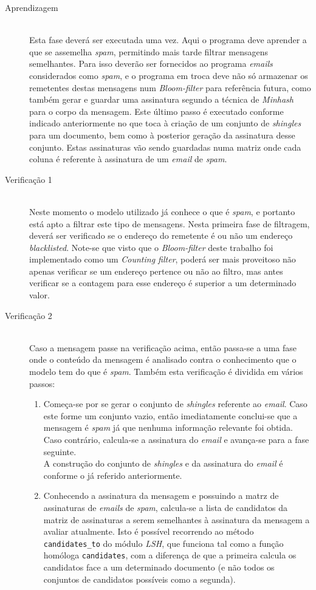 \documentclass[a4paper,11pt,openright,oneside]{report}
\begin{document}
\begin{description}
\item[Aprendizagem] \hfill \\
  Esta fase deverá ser executada uma vez. Aqui o programa deve aprender a que se assemelha \textit{spam}, permitindo mais tarde filtrar mensagens semelhantes. Para isso deverão ser fornecidos ao programa \textit{emails} considerados como \textit{spam}, e o programa em troca deve não só armazenar os remetentes destas mensagens num \textit{Bloom-filter} para referência futura, como também gerar e guardar uma assinatura segundo a técnica de \textit{Minhash} para o corpo da mensagem. Este último passo é executado conforme indicado anteriormente no que toca à criação de um conjunto de \textit{shingles} para um documento, bem como à posterior geração da assinatura desse conjunto. Estas assinaturas vão sendo guardadas numa matriz onde cada coluna é referente à assinatura de um \textit{email} de \textit{spam}.
\item[Verificação 1] \hfill \\
  Neste momento o modelo utilizado já conhece o que é \textit{spam}, e portanto está apto a filtrar este tipo de mensagens. Nesta primeira fase de filtragem, deverá ser verificado se o endereço do remetente é ou não um endereço \textit{blacklisted}. Note-se que visto que o \textit{Bloom-filter} deste trabalho foi implementado como um \textit{Counting filter}, poderá ser mais proveitoso não apenas verificar se um endereço pertence ou não ao filtro, mas antes verificar se a contagem para esse endereço é superior a um determinado valor.
\item[Verificação 2] \hfill \\
  Caso a mensagem passe na verificação acima, então passa-se a uma fase onde o conteúdo da mensagem é analisado contra o conhecimento que o modelo tem do que é \textit{spam}. Também esta verificação é dividida em vários passos:
  \begin{enumerate}
  \item Começa-se por se gerar o conjunto de \textit{shingles} referente ao \textit{email}. Caso este forme um conjunto vazio, então imediatamente conclui-se que a mensagem é \textit{spam} já que nenhuma informação relevante foi obtida. Caso contrário, calcula-se a assinatura do \textit{email} e avança-se para a fase seguinte. \\
    A construção do conjunto de \textit{shingles} e da assinatura do \textit{email} é conforme o já referido anteriormente.
  \item Conhecendo a assinatura da mensagem e possuindo a matrz de assinaturas de \textit{emails} de \textit{spam}, calcula-se a lista de candidatos da matriz de assinaturas a serem semelhantes à assinatura da mensagem a avaliar atualmente. Isto é possível recorrendo ao método \texttt{candidates\_to} do módulo \textit{LSH}, que funciona tal como a função homóloga \texttt{candidates}, com a diferença de que a primeira calcula os candidatos face a um determinado documento (e não todos os conjuntos de candidatos possíveis como a segunda). \\

\end{enumerate}
\end{description}
\end{document}
